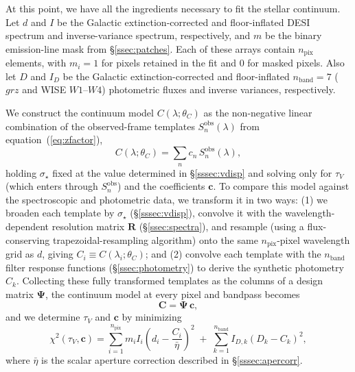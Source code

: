\documentclass[modern,linenumbers]{aastex701}
\newcommand{\vdisp}{\ensuremath{\sigma_\star}}
\newcommand{\tauv}{\ensuremath{\tau_V}}
\begin{document}
At this point, we have all the ingredients necessary to fit the
stellar continuum. Let $d$ and $I$ be the Galactic
extinction-corrected and floor-inflated DESI spectrum and
inverse-variance spectrum, respectively, and $m$ be the binary
emission-line mask from \S\ref{ssec:patches}. Each of these arrays
contain $n_\mathrm{pix}$ elements, with $m_i=1$ for pixels retained in
the fit and $0$ for masked pixels. Also let $D$ and $I_D$ be the
Galactic extinction-corrected and floor-inflated $n_\mathrm{band}=7$
($grz$ and WISE $W1$--$W4$) photometric fluxes and inverse variances,
respectively.

We construct the continuum model $C(\lambda;\theta_C)$ as the
non-negative linear combination of the observed-frame templates
$S_n^\mathrm{obs}(\lambda)$ from equation~(\ref{eq:zfactor}),
\begin{equation}
  C(\lambda;\theta_C) = \sum_n c_n\,S_n^\mathrm{obs}(\lambda),
  \label{eq:ccont}
\end{equation}
holding \vdisp{} fixed at the value determined in \S\ref{sssec:vdisp}
and solving only for $\tauv$ (which enters through $S_n^\mathrm{obs}$)
and the coefficients $\mathbf{c}$. To compare this model against the
spectroscopic and photometric data, we transform it in two ways: (1)
we broaden each template by \vdisp{} (\S\ref{sssec:vdisp}), convolve
it with the wavelength-dependent resolution matrix $\mathbf{R}$
(\S\ref{ssec:spectra}), and resample (using a flux-conserving
trapezoidal-resampling algorithm) onto the same $n_\mathrm{pix}$-pixel
wavelength grid as $d$, giving $C_i \equiv C(\lambda_i;\theta_C)$; and
(2) convolve each template with the $n_\mathrm{band}$ filter response
functions (\S\ref{ssec:photometry}) to derive the synthetic photometry
$C_k$. Collecting these fully transformed templates as the columns of
a design matrix $\boldsymbol{\Psi}$, the continuum model at every
pixel and bandpass becomes
\begin{equation}
  \mathbf{C} = \boldsymbol{\Psi}\,\mathbf{c},
  \label{eq:designmatrix}
\end{equation}
\noindent and we determine $\tauv$ and $\mathbf{c}$ by minimizing
\begin{equation}
  \chi^2(\tauv,\mathbf{c})
  =
  \sum_{i=1}^{n_\mathrm{pix}} m_i I_i\left(d_i - \frac{C_i}{\bar\eta}\right)^2
  \;+\;
  \sum_{k=1}^{n_\mathrm{band}} I_{D,k}\left(D_k - C_k\right)^2,
  \label{eq:chi2cont}
\end{equation}
where $\bar\eta$ is the scalar aperture correction described in
\S\ref{sssec:apercorr}.
\end{document}
